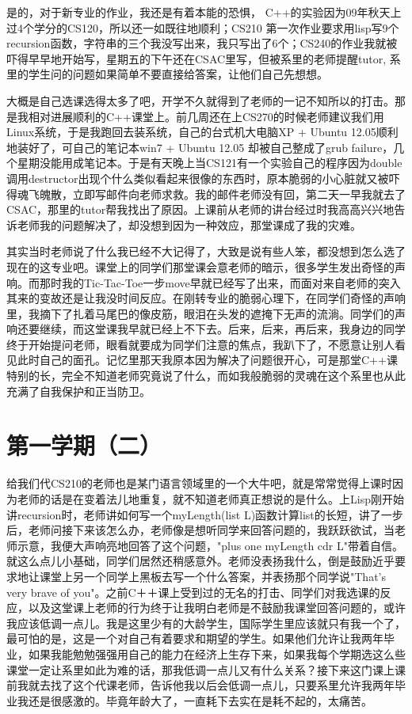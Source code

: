 \documentclass[12pt]{book}
\begin{document}
是的，对于新专业的作业，我还是有着本能的恐惧， C++的实验因为09年秋天上过4个学分的CS120，所以还一如既往地顺利；CS210 第一次作业要求用lisp写9个recursion函数，字符串的三个我没写出来，我只写出了6个；CS240的作业我就被吓得早早地开始写，星期五的下午还在CSAC里写，但被系里的老师提醒tutor, 系里的学生问的问题如果简单不要直接给答案，让他们自己先想想。 

大概是自己选课选得太多了吧，开学不久就得到了老师的一记不知所以的打击。那是我相对进展顺利的C++课堂上。前几周还在上CS270的时候老师建议我们用Linux系统，于是我跑回去装系统，自己的台式机大电脑XP + Ubuntu 12.05顺利地装好了，可自己的笔记本win7 + Ubuntu 12.05 却被自己整成了grub failure，几个星期没能用成笔记本。于是有天晚上当CS121有一个实验自己的程序因为double 调用destructor出现个什么类似看起来很像的东西时，原本脆弱的小心脏就又被吓得魂飞魄散，立即写邮件向老师求救。我的邮件老师没有回，第二天一早我就去了CSAC，那里的tutor帮我找出了原因。上课前从老师的讲台经过时我高高兴兴地告诉老师我的问题解决了，却没想到因为一种效应，那堂课成了我的灾难。

其实当时老师说了什么我已经不大记得了，大致是说有些人笨，都没想到怎么选了现在的这专业吧。课堂上的同学们那堂课会意老师的暗示，很多学生发出奇怪的声响。而那时我的Tic-Tac-Toe一步move早就已经写了出来，而面对来自老师的突入其来的变故还是让我没时间反应。在刚转专业的脆弱心理下，在同学们奇怪的声响里，我摘下了扎着马尾巴的像皮筋，眼泪在头发的遮掩下无声的流淌。同学们的声响还要继续，而这堂课我早就已经上不下去。后来，后来，再后来，我身边的同学终于开始提问老师，眼看就要成为同学们注意的焦点，我趴下了，不愿意让别人看见此时自己的面孔。记忆里那天我原本因为解决了问题很开心，可是那堂C++课特别的长，完全不知道老师究竟说了什么，而如我般脆弱的灵魂在这个系里也从此充满了自我保护和正当防卫。

\section{第一学期（二）}
\label{sec-3-2}
给我们代CS210的老师也是某门语言领域里的一个大牛吧，就是常常觉得上课时因为老师的话是在变着法儿地重复，就不知道老师真正想说的是什么。上Lisp刚开始讲recursion时，老师讲如何写一个myLength(list L)函数计算list的长短，讲了一步后，老师问接下来该怎么办，老师像是想听同学来回答问题的，我跃跃欲试，当老师示意，我便大声响亮地回答了这个问题，"plus one myLength cdr L"带着自信。就这么点儿小基础，同学们居然还稍感意外。老师没表扬我什么，倒是鼓励近乎要求地让课堂上另一个同学上黑板去写一个什么答案，并表扬那个同学说"That's very brave of you"。之前C＋＋课上受到过的无名的打击、同学们对我选课的反应，以及这堂课上老师的行为终于让我明白老师是不鼓励我课堂回答问题的，或许我应该低调一点儿。我是这里少有的大龄学生，国际学生里应该就只有我一个了，最可怕的是，这是一个对自己有着要求和期望的学生。如果他们允许让我两年毕业，如果我能勉勉强强用自己的能力在经济上生存下来，如果我每个学期选这么些课堂一定让系里如此为难的话，那我低调一点儿又有什么关系？接下来这门课上课前我就去找了这个代课老师，告诉他我以后会低调一点儿，只要系里允许我两年毕业我还是很感激的。毕竟年龄大了，一直耗下去实在是耗不起的，太痛苦。
\end{document}
